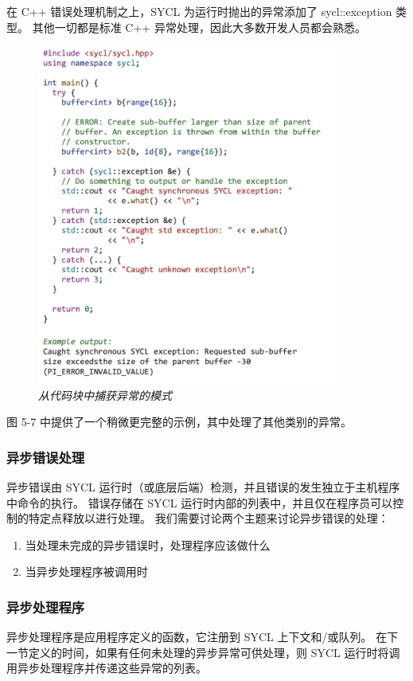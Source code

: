 在 C++ 错误处理机制之上，SYCL 为运行时抛出的异常添加了 sycl::exception 类型。 
其他一切都是标准 C++ 异常处理，因此大多数开发人员都会熟悉。

\begin{figure}[H]
	\centering
	\includegraphics[width=0.9\textwidth]{figs/F5.7.png}
	\caption{\textit{从代码块中捕获异常的模式}}
\end{figure}

图 5-7 中提供了一个稍微更完整的示例，其中处理了其他类别的异常。

\subsubsection{异步错误处理}
异步错误由 SYCL 运行时（或底层后端）检测，并且错误的发生独立于主机程序中命令的执行。 
错误存储在 SYCL 运行时内部的列表中，并且仅在程序员可以控制的特定点释放以进行处理。 
我们需要讨论两个主题来讨论异步错误的处理：

\begin{enumerate}
	\item 当处理未完成的异步错误时，处理程序应该做什么
	\item 当异步处理程序被调用时
\end{enumerate}

\subsubsection{异步处理程序}
异步处理程序是应用程序定义的函数，它注册到 SYCL 上下文和/或队列。 
在下一节定义的时间，如果有任何未处理的异步异常可供处理，则 SYCL 运行时将调用异步处理程序并传递这些异常的列表。

